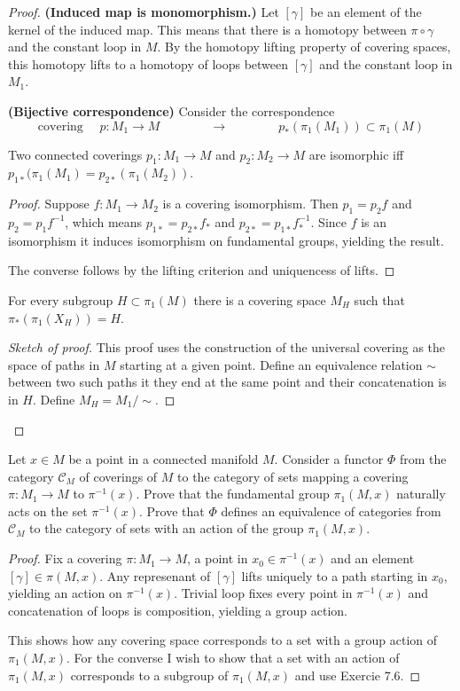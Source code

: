 \documentclass{article}
\newcommand{\Cc}{\mathcal{C}}
\begin{document}
\begin{proof}
	\textbf{(Induced map is monomorphism.)} Let $[\gamma]$ be an element of the kernel of the induced map. This means that there is a homotopy between $\pi\circ\gamma$ and the constant loop in $M$. By the homotopy lifting property of covering spaces, this homotopy lifts to a homotopy of loops between $[\gamma]$ and the constant loop in $M_1$.
	
	\textbf{(Bijective correspondence)} Consider the correspondence
	\[\text{covering }\quad p:M_1\to M\qquad\qquad\to\qquad\qquad p_*(\pi_1(M_1))\subset\pi_1(M)\]
	
	\begin{claim}
		Two connected coverings $p_1:M_1\to M$ and $p_2:M_2\to M$ are isomorphic iff $p_{1*}(\pi_1(M_1)=p_{2*}(\pi_1(M_2))$.
	\end{claim}
	\begin{proof}
		Suppose $f:M_1\to M_2$ is a covering isomorphism. Then $p_1=p_2f$ and $p_2=p_1f^{-1}$, which means $p_{1*}=p_{2*}f_*$ and $p_{2*}=p_{1*}f^{-1}_*$. Since $f$ is an isomorphism it induces isomorphism on fundamental groups, yielding the result.
		
		The converse follows by the lifting criterion and uniquencess of lifts.
	\end{proof}
	
	\begin{claim}
		For every subgroup $H\subset \pi_1(M)$ there is a covering space $M_H$ such that $\pi_*(\pi_1(X_H))=H$. 
	\end{claim}
	\begin{proof}[Sketch of proof]
		 This proof uses the construction of the universal covering as the space of paths in $M$ starting at a given point. Define an equivalence relation $\sim$ between two such paths it they end at the same point and their concatenation is in $H$. Define $M_H=M_1/\sim$.
	\end{proof}
\end{proof}
\begin{exercise}
	Let $x\in M$ be a point in a connected manifold $M$. Consider a functor $\Phi$ from the category $\Cc_M$ of coverings of $M$ to the category of sets mapping a covering $\pi:M_1\to M$ to $\pi^{-1}(x)$. Prove that the fundamental group $\pi_1(M,x)$ naturally acts on the set $\pi^{-1}(x)$. Prove that $\Phi$ defines an equivalence of categories from $\Cc_M$ to the category of sets with an action of the group $\pi_1(M,x)$.
\end{exercise}
\begin{proof}
	Fix a covering $\pi:M_1\to M$, a point in $x_0\in\pi^{-1}(x)$ and an element $[\gamma]\in\pi(M,x)$. Any represenant of $[\gamma]$ lifts uniquely to a path starting in $x_0$, yielding an action on $\pi^{-1}(x)$. Trivial loop fixes every point in $\pi^{-1}(x)$ and concatenation of loops is composition, yielding a group action.
	
	This shows how any covering space corresponds to a set with a group action of $\pi_1(M,x)$. For the converse {\color{red}I wish to show} that a set with an action of $\pi_1(M,x)$ corresponds to a subgroup of $\pi_1(M,x)$ and use Exercie 7.6.
\end{proof}
\end{document}

